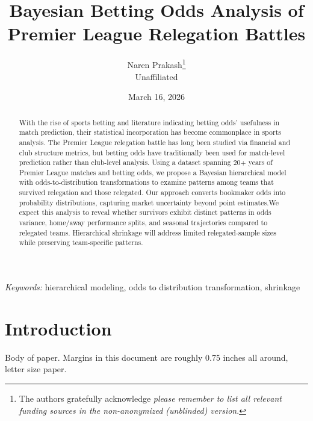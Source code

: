 \documentclass[
  12pt]{article}
\begin{document}
\def\spacingset#1{\renewcommand{\baselinestretch}%
{#1}\small\normalsize} \spacingset{1}



\date{March 16, 2026}
\title{\bf Bayesian Betting Odds Analysis of Premier League Relegation
Battles}
\author{
Naren Prakash\thanks{The authors gratefully acknowledge \emph{please
remember to list all relevant funding sources in the non-anonymized
(unblinded) version}.}\\
Unaffiliated\\
}
\maketitle

\bigskip
\bigskip
\begin{abstract}
With the rise of sports betting and literature indicating betting odds'
usefulness in match prediction, their statistical incorporation has
become commonplace in sports analysis. The Premier League relegation
battle has long been studied via financial and club structure metrics,
but betting odds have traditionally been used for match-level prediction
rather than club-level analysis. Using a dataset spanning 20+ years of
Premier League matches and betting odds, we propose a Bayesian
hierarchical model with odds-to-distribution transformations to examine
patterns among teams that survived relegation and those relegated. Our
approach converts bookmaker odds into probability distributions,
capturing market uncertainty beyond point estimates.We expect this
analysis to reveal whether survivors exhibit distinct patterns in odds
variance, home/away performance splits, and seasonal trajectories
compared to relegated teams. Hierarchical shrinkage will address limited
relegated-sample sizes while preserving team-specific patterns.
\end{abstract}

\noindent%
{\it Keywords:} hierarchical modeling, odds to distribution
transformation, shrinkage
\vfill

\newpage
\spacingset{1.9} %


\section{Introduction}\label{sec-intro}

Body of paper. Margins in this document are roughly 0.75 inches all
around, letter size paper.
\end{document}
